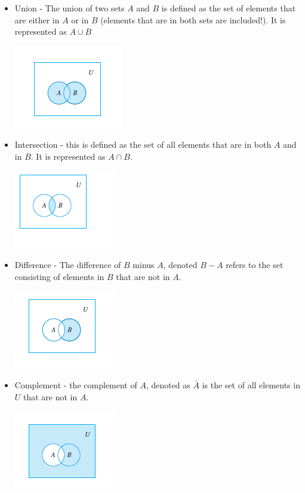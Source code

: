 \documentclass[12pt]{article}
\begin{document}
\begin{itemize}
\item  Union - The union of two sets $A$ and $B$ is defined as the set of elements that are either in $A$ or in $B$ (elements that are in both sets are included!). It is represented as $A \cup B$

\includegraphics{./img/Union.png}

\item Intersection - this is defined as the set of all elements that are in both $A$ and in $B$. It is represented as $A \cap B$.

\includegraphics{./img/Intersect.png}

\item Difference - The difference of $B$ minus $A$, denoted $B - A$ refers to the set consisting of elements in $B$ that are not in $A$.

\includegraphics{./img/Difference.png}

\item Complement - the complement of $A$, denoted as $\bar{A}$ is the set of all elements in $U$ that are not in $A$.

\includegraphics{./img/Complement.png}

\end{itemize}
\end{document}
